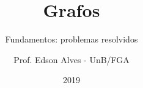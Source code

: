 \title{Grafos}
\subtitle{Fundamentos: problemas resolvidos}
\author{Prof. Edson Alves - UnB/FGA}
\date{2019}
